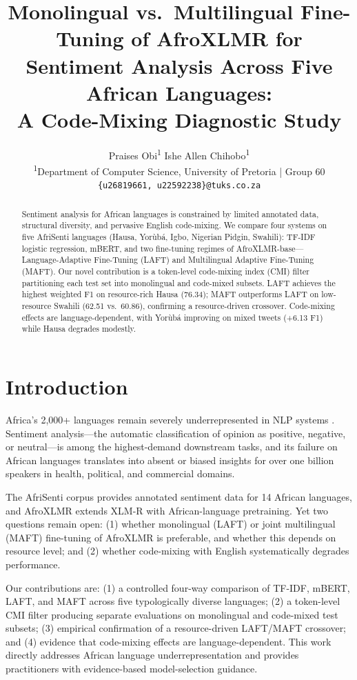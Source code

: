 \documentclass[11pt,twocolumn]{article}
\title{\large\textbf{Monolingual vs.\ Multilingual Fine-Tuning of AfroXLMR for\\
Sentiment Analysis Across Five African Languages:\\
A Code-Mixing Diagnostic Study}}
\author{
  \small Praises Obi\textsuperscript{1} \quad Ishe Allen Chihobo\textsuperscript{1} \\
  \small \textsuperscript{1}Department of Computer Science, University of Pretoria | Group 60 \\
  \small \texttt{\{u26819661, u22592238\}@tuks.co.za}
}
\date{}
\begin{document}
\maketitle

\begin{abstract}
\small
Sentiment analysis for African languages is constrained by limited annotated data, structural
diversity, and pervasive English code-mixing. We compare four systems on five AfriSenti languages
(Hausa, Yor\`{u}b\'{a}, Igbo, Nigerian Pidgin, Swahili): TF-IDF logistic regression, mBERT, and
two fine-tuning regimes of AfroXLMR-base---Language-Adaptive Fine-Tuning (LAFT) and Multilingual
Adaptive Fine-Tuning (MAFT). Our novel contribution is a token-level code-mixing index (CMI)
filter partitioning each test set into monolingual and code-mixed subsets. LAFT achieves the
highest weighted F1 on resource-rich Hausa (76.34); MAFT outperforms LAFT on low-resource Swahili
(62.51 vs.\ 60.86), confirming a resource-driven crossover. Code-mixing effects are
language-dependent, with Yor\`{u}b\'{a} improving on mixed tweets (+6.13 F1) while Hausa degrades
modestly.
\end{abstract}

\section{Introduction}

Africa's 2,000+ languages remain severely underrepresented in NLP systems
\cite{adebara-abdulmageed-2022-towards}. Sentiment analysis---the automatic classification of
opinion as positive, negative, or neutral---is among the highest-demand downstream tasks, and
its failure on African languages translates into absent or biased insights for over one billion
speakers in health, political, and commercial domains.

The AfriSenti corpus \cite{muhammad-etal-2023-afrisenti} provides annotated sentiment data for
14 African languages, and AfroXLMR \cite{alabi-etal-2022-adapting} extends XLM-R with
African-language pretraining. Yet two questions remain open: (1) whether monolingual (LAFT) or
joint multilingual (MAFT) fine-tuning of AfroXLMR is preferable, and whether this depends on
resource level; and (2) whether code-mixing with English systematically degrades performance.

Our contributions are: (1) a controlled four-way comparison of TF-IDF, mBERT, LAFT, and MAFT
across five typologically diverse languages; (2) a token-level CMI filter producing separate
evaluations on monolingual and code-mixed test subsets; (3) empirical confirmation of a
resource-driven LAFT/MAFT crossover; and (4) evidence that code-mixing effects are
language-dependent. This work directly addresses African language underrepresentation and provides
practitioners with evidence-based model-selection guidance.
\end{document}
